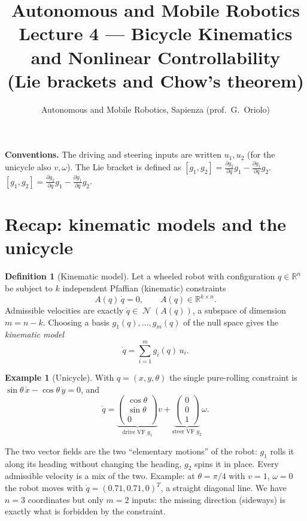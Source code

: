\documentclass[11pt,a4paper]{article}
\title{\textbf{Autonomous and Mobile Robotics}\\[2pt]
\large Lecture 4 --- Bicycle Kinematics and Nonlinear Controllability\\[2pt]
\normalsize (Lie brackets and Chow's theorem)}
\author{Autonomous and Mobile Robotics, Sapienza (prof.\ G.\ Oriolo)}
\date{}
\newcommand{\R}{\mathbb{R}}
\newcommand{\LB}[2]{[#1,#2]}
\DeclareMathOperator{\Ker}{\mathcal{N}}
\theoremstyle{plain}
\theoremstyle{definition}
\newtheorem{definition}[theorem]{Definition}
\newtheorem{example}[theorem]{Example}
\theoremstyle{remark}
\begin{document}
\maketitle
\tableofcontents
\bigskip

\noindent\textbf{Conventions.} The driving and steering inputs are written $u_1,u_2$ (for the unicycle also $v,\omega$). The Lie bracket is defined as
$\LB{g_1}{g_2}=\frac{\partial g_2}{\partial q}g_1-\frac{\partial g_1}{\partial q}g_2$.
$\LB{g_1}{g_2}=\frac{\partial g_2}{\partial q}g_1-\frac{\partial g_1}{\partial q}g_2$.

\section{Recap: kinematic models and the unicycle}

\begin{definition}[Kinematic model]
Let a wheeled robot with configuration $q\in\R^n$ be subject to $k$ independent Pfaffian (kinematic) constraints
\[
A(q)\,\dot q=0,\qquad A(q)\in\R^{k\times n}.
\]
Admissible velocities are exactly $\dot q\in\Ker(A(q))$, a subspace of dimension $m=n-k$. Choosing a basis $g_1(q),\dots,g_m(q)$ of the null space gives the \emph{kinematic model}
\[
\dot q=\sum_{i=1}^{m} g_i(q)\,u_i .
\]
\end{definition}

\begin{example}[Unicycle]
With $q=(x,y,\theta)$ the single pure-rolling constraint is $\sin\theta\,\dot x-\cos\theta\,\dot y=0$, and
\[
\dot q=\underbrace{\begin{pmatrix}\cos\theta\\ \sin\theta\\ 0\end{pmatrix}}_{\text{drive VF } g_1}v
+\underbrace{\begin{pmatrix}0\\0\\1\end{pmatrix}}_{\text{steer VF } g_2}\omega .
\]
\end{example}

\begin{intuition}
The two vector fields are the two ``elementary motions'' of the robot: $g_1$ rolls it along its heading without changing the heading, $g_2$ spins it in place. Every admissible velocity is a mix of the two. Example: at $\theta=\pi/4$ with $v=1$, $\omega=0$ the robot moves with $\dot q=(0.71,0.71,0)^T$, a straight diagonal line. We have $n=3$ coordinates but only $m=2$ inputs: the missing direction (sideways) is exactly what is forbidden by the constraint.
\end{intuition}
\end{document}
